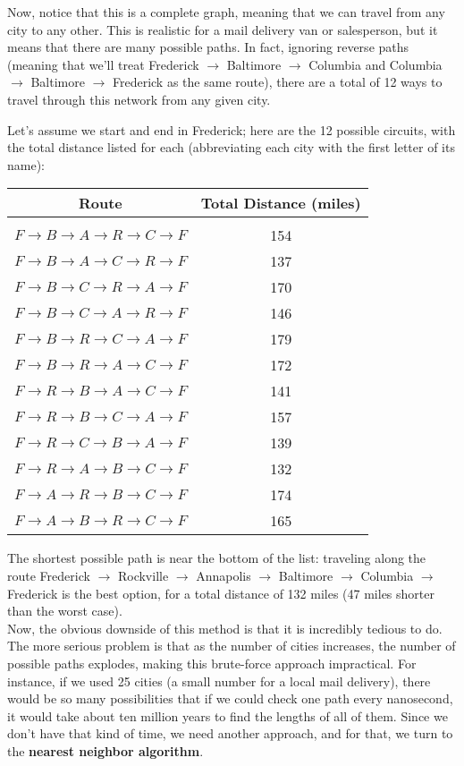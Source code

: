 Now, notice that this is a complete graph, meaning that we can travel from any city to any other.  This is realistic for a mail delivery van or salesperson, but it means that there are many possible paths.  In fact, ignoring reverse paths (meaning that we'll treat Frederick $\to$ Baltimore $\to$ Columbia and Columbia $\to$ Baltimore $\to$ Frederick as the same route), there are a total of 12 ways to travel through this network from any given city.

Let's assume we start and end in Frederick; here are the 12 possible circuits, with the total distance listed for each (abbreviating each city with the first letter of its name):
\begin{center}
\begin{tabular}{c c}
\textbf{Route} & \textbf{Total Distance (miles)}\\
\hline
& \\
$F \to B \to A \to R \to C \to F$ & 154\\
$F \to B \to A \to C \to R \to F$ & 137\\
$F \to B \to C \to R \to A \to F$ & 170\\
$F \to B \to C \to A \to R \to F$ & 146\\
$F \to B \to R \to C \to A \to F$ & 179\\
$F \to B \to R \to A \to C \to F$ & 172\\
$F \to R \to B \to A \to C \to F$ & 141\\
$F \to R \to B \to C \to A \to F$ & 157\\
$F \to R \to C \to B \to A \to F$ & 139\\
$F \to R \to A \to B \to C \to F$ & 132\\
$F \to A \to R \to B \to C \to F$ & 174\\
$F \to A \to B \to R \to C \to F$ & 165\\
\end{tabular}
\end{center}

The shortest possible path is near the bottom of the list: traveling along the route Frederick $\to$ Rockville $\to$ Annapolis $\to$ Baltimore $\to$ Columbia $\to$ Frederick is the best option, for a total distance of 132 miles (47 miles shorter than the worst case).\\

Now, the obvious downside of this method is that it is incredibly tedious to do.  The more serious problem is that as the number of cities increases, the number of possible paths explodes, making this brute-force approach impractical.  For instance, if we used 25 cities (a small number for a local mail delivery), there would be so many possibilities that if we could check one path every nanosecond, it would take about ten million years to find the lengths of all of them.  Since we don't have that kind of time, we need another approach, and for that, we turn to the \textbf{nearest neighbor algorithm}.

